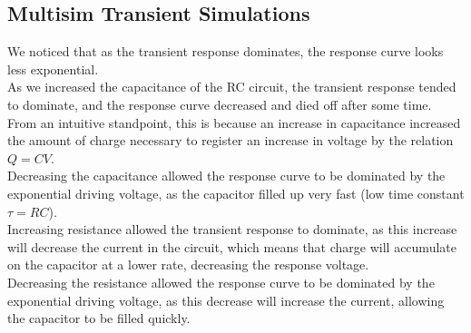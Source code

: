 \documentclass{article}
\begin{document}
\subsection{Multisim Transient Simulations}
    We noticed that as the transient response dominates, the response curve looks less exponential.\\\indent
    As we increased the capacitance of the RC circuit, the transient response tended to dominate, and the response curve decreased and died off after some time. From an intuitive standpoint, this is because an increase in capacitance increased the amount of charge necessary to register an increase in voltage by the relation $Q = CV$.\\\indent Decreasing the capacitance allowed the response curve to be dominated by the exponential driving voltage, as the capacitor filled up very fast (low time constant $\tau = RC$).\\\indent Increasing resistance allowed the transient response to dominate, as this increase will decrease the current in the circuit, which means that charge will accumulate on the capacitor at a lower rate, decreasing the response voltage. \\\indent Decreasing the resistance allowed the response curve to be dominated by the exponential driving voltage, as this decrease will increase the current, allowing the capacitor to be filled quickly.
\end{document}
